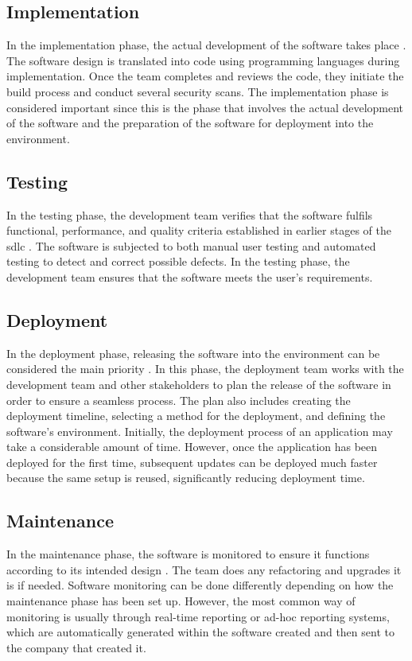 \subsection{Implementation}
In the implementation phase, the actual development of the software takes place \cite{ImplementationSDLC}. The software design is translated into code using programming languages during implementation. Once the team completes and reviews the code, they initiate the build process and conduct several security scans. The implementation phase is considered important since this is the phase that involves the actual development of the software and the preparation of the software for deployment into the environment.  
 
\subsection{Testing}
In the testing phase, the development team verifies that the software fulfils functional, performance, and quality criteria established in earlier stages of the \acrshort{sdlc} \cite{TestingSDLC}. The software is subjected to both manual user testing and automated testing to detect and correct possible defects. In the testing phase, the development team ensures that the software meets the user's requirements.
 
\subsection{Deployment}
In the deployment phase, releasing the software into the environment can be considered the main priority \cite{DeploymentSDLC}. In this phase, the deployment team works with the development team and other stakeholders to plan the release of the software in order to ensure a seamless process. The plan also includes creating the deployment timeline, selecting a method for the deployment, and defining the software's environment. Initially, the deployment process of an application may take a considerable amount of time. However, once the application has been deployed for the first time, subsequent updates can be deployed much faster because the same setup is reused, significantly reducing deployment time. 

\subsection{Maintenance} 
In the maintenance phase, the software is monitored to ensure it functions according to its intended design \cite{MaintenanceSDLC}. The team does any refactoring and upgrades it is if needed. Software monitoring can be done differently depending on how the maintenance phase has been set up. However, the most common way of monitoring is usually through real-time reporting or ad-hoc reporting systems, which are automatically generated within the software created and then sent to the company that created it. 


